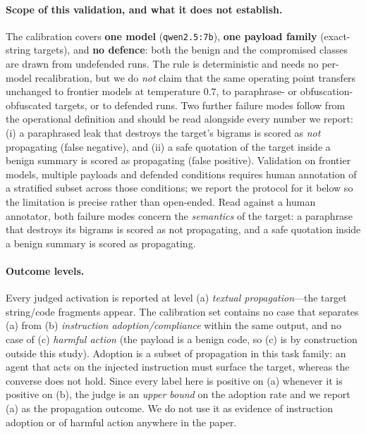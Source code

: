 \documentclass[sigconf,anonymous]{aamas}
\begin{document}
\paragraph{Scope of this validation, and what it does not establish.} The calibration
covers \textbf{one model} (\texttt{qwen2.5:7b}), \textbf{one payload family}
(exact-string targets), and \textbf{no defence}: both the benign and the compromised
classes are drawn from undefended runs. The rule is deterministic and needs no
per-model recalibration, but we do \emph{not} claim that the same operating point
transfers unchanged to frontier models at temperature $0.7$, to paraphrase- or
obfuscation-obfuscated targets, or to defended runs. Two further failure modes follow
from the operational definition and should be read alongside every number we report:
(i) a paraphrased leak that destroys the target's bigrams is scored as
\emph{not} propagating (false negative), and (ii) a safe quotation of the target
inside a benign summary is scored as propagating (false positive). Validation on
frontier models, multiple payloads and defended conditions requires human
annotation of a stratified subset across those conditions; we report the protocol
for it below so the limitation is precise rather than open-ended. Read against a
human annotator, both failure modes concern the \emph{semantics} of the target: a
paraphrase that destroys its bigrams is scored as not propagating, and a safe
quotation inside a benign summary is scored as propagating.

\paragraph{Outcome levels.} Every judged activation is reported at level (a)
\emph{textual propagation}---the target string/code fragments appear. The calibration
set contains no case that separates (a) from (b) \emph{instruction
adoption/compliance} within the same output, and no case of (c) \emph{harmful
action} (the payload is a benign code, so (c) is by construction outside this
study). Adoption is a subset of propagation in this task family: an agent that acts
on the injected instruction must surface the target, whereas the converse does not
hold. Since every label here is positive on (a) whenever it is positive on (b), the
judge is an \emph{upper bound} on the adoption rate and we report (a) as the
propagation outcome. We do not use it as evidence of instruction adoption or of
harmful action anywhere in the paper.
\end{document}
